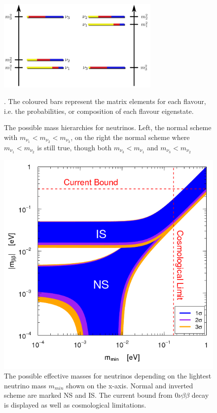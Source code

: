    \begin{figure}
    \centering
    \includegraphics[width=0.7\textwidth]{graphics/standardModel/massHierarchy.jpg}
    	 \caption[Neutrino mass hierarchy]{The possible mass hierarchies for neutrinos. Left, the normal scheme with $m_{\nu_1} < m_{\nu_2} < m_{\nu_3}$, on the right the normal scheme where $m_{\nu_1} < m_{\nu_2}$ is still true, though both $m_{\nu_3} < m_{\nu_1}$ and $m_{\nu_3} < m_{\nu_2}$ }. The coloured bars represent the matrix elements for each flavour, i.e. the probabilities, or composition of each flavour eigenstate.
    	\label{fig:massSchemes}
    \end{figure}
    \begin{figure}
    \centering
    \includegraphics[width = 0.7 \textwidth]{graphics/standardModel/massSchemes.png}
	\caption[Effective neutrino mass]{The possible effective masses for neutrinos depending on the lightest neutrino mass $m_{min}$ shown on the x-axis. Normal and inverted scheme are marked NS and IS. The current bound from $0\nu\beta\beta$ decay is displayed as well as cosmological limitations. }
    	\label{fig:massHierarchy}
    \end{figure}

